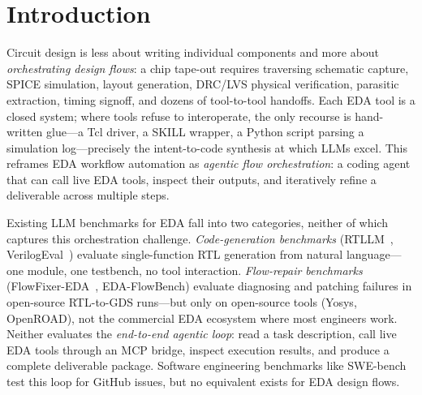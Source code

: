 \section{Introduction}
\label{sec:introduction}

Circuit design is less about writing individual components and more about \emph{orchestrating design flows}: a chip tape-out requires traversing schematic capture, SPICE simulation, layout generation, DRC/LVS physical verification, parasitic extraction, timing signoff, and dozens of tool-to-tool handoffs. Each EDA tool is a closed system; where tools refuse to interoperate, the only recourse is hand-written glue---a Tcl driver, a SKILL wrapper, a Python script parsing a simulation log---precisely the intent-to-code synthesis at which LLMs excel. This reframes EDA workflow automation as \emph{agentic flow orchestration}: a coding agent that can call live EDA tools, inspect their outputs, and iteratively refine a deliverable across multiple steps.

Existing LLM benchmarks for EDA fall into two categories, neither of which captures this orchestration challenge. \emph{Code-generation benchmarks} (RTLLM~\cite{lu2024rtllm}, VerilogEval~\cite{liu2023verilogeval}) evaluate single-function RTL generation from natural language---one module, one testbench, no tool interaction. \emph{Flow-repair benchmarks} (FlowFixer-EDA~\cite{dong2026flowfixer}, EDA-FlowBench) evaluate diagnosing and patching failures in open-source RTL-to-GDS runs---but only on open-source tools (Yosys, OpenROAD), not the commercial EDA ecosystem where most engineers work. Neither evaluates the \emph{end-to-end agentic loop}: read a task description, call live EDA tools through an MCP bridge, inspect execution results, and produce a complete deliverable package. Software engineering benchmarks like SWE-bench~\cite{jimenez2024swebench} test this loop for GitHub issues, but no equivalent exists for EDA design flows.

